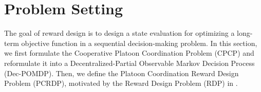 \documentclass[lettersize,journal]{IEEEtran}
\begin{document}

\section{Problem Setting}
The goal of reward design is to design a state evaluation for optimizing a long-term objective function in a sequential decision-making problem. 
In this section, we first formulate the Cooperative Platoon Coordination Problem (CPCP) and reformulate it into a Decentralized-Partial Observable Markov Decision Process (Dec-POMDP). 
Then, we define the Platoon Coordination Reward Design Problem (PCRDP), motivated by the Reward Design Problem (RDP) in \cite{singh2009rewards}.
\end{document}
